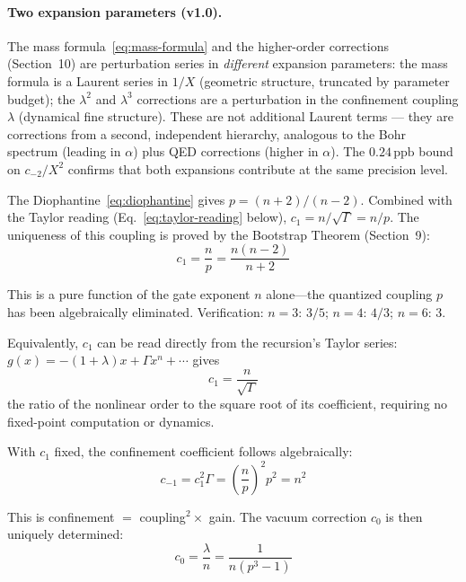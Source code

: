 \documentclass[12pt,a4paper]{article}
\theoremstyle{definition}
\newcommand{\ppb}{\,\mathrm{ppb}}
\begin{document}
\paragraph{Two expansion parameters (v1.0).}
The mass formula~\eqref{eq:mass-formula} and the higher-order corrections
(Section~10) are perturbation series in \emph{different} expansion
parameters: the mass formula is a Laurent series in $1/X$ (geometric
structure, truncated by parameter budget); the $\lambda^2$ and $\lambda^3$
corrections are a perturbation in the confinement coupling $\lambda$
(dynamical fine structure). These are not additional Laurent terms ---
they are corrections from a second, independent hierarchy, analogous to
the Bohr spectrum (leading in $\alpha$) plus QED corrections (higher
in $\alpha$). The $0.24\ppb$ bound on $c_{-2}/X^2$ confirms that both
expansions contribute at the same precision level.

The Diophantine~\eqref{eq:diophantine} gives $p = (n+2)/(n-2)$. Combined
with the Taylor reading (Eq.~\ref{eq:taylor-reading} below),
$c_1 = n/\sqrt{\Gamma} = n/p$. The uniqueness of this coupling is proved
by the Bootstrap Theorem (Section~9):
\begin{equation}\label{eq:c1}
  c_1 = \frac{n}{p} = \frac{n(n-2)}{n+2}
\end{equation}

This is a pure function of the gate exponent $n$ alone---the quantized
coupling $p$ has been algebraically eliminated. Verification:
$n=3$: $3/5$; $n=4$: $4/3$; $n=6$: $3$.

Equivalently, $c_1$ can be read directly from the recursion's Taylor
series: $g(x) = -(1+\lambda)x + \Gamma x^n + \cdots$ gives
\begin{equation}\label{eq:taylor-reading}
  c_1 = \frac{n}{\sqrt{\Gamma}}
\end{equation}
the ratio of the nonlinear order to the square root of its coefficient,
requiring no fixed-point computation or dynamics.

With $c_1$ fixed, the confinement coefficient follows algebraically:
\begin{equation}\label{eq:c-1}
  c_{-1} = c_1^2 \Gamma = \left(\frac{n}{p}\right)^2 p^2 = n^2
\end{equation}

This is confinement $=$ coupling${}^2 \times$ gain. The vacuum correction
$c_0$ is then uniquely determined:
\begin{equation}\label{eq:c0}
  c_0 = \frac{\lambda}{n} = \frac{1}{n(p^3-1)}
\end{equation}
\end{document}
